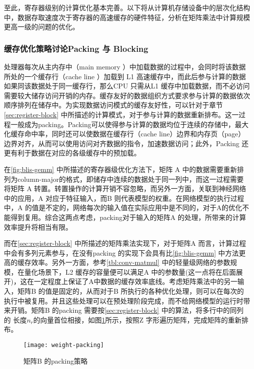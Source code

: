 至此，寄存器级别的计算优化基本完善。以下将从计算机存储设备中的层次化结构中，数据存取速度次于寄存器的高速缓存的硬件特征，分析在矩阵乘法中计算规模更高一级的问题的优化。

\subsubsection{缓存优化策略讨论Packing 与 Blocking}

处理器每次从主内存中（main memory ）中加载数据的过程中，会同时将该数据所处的一个缓存行（cache line ）加载到 L1 高速缓存中，而此后参与计算的数据如果同该数据处于同一缓存行，那么CPU 只需从L1 缓存中加载数据，而不必访问需要较大储存访问开销的内存。缓存友好的数据组织方式要求参与计算的数据依次顺序排列在储存中。为实现数据访问模式的缓存友好性，可以针对于章节\ref{sec:register-block} 中所描述的计算模式，对于参与计算的数据重新排布。这一过程一般成为packing。Packing可以使得参与计算的数据均位于连续的存储中，最大化缓存命中率，同时还可以使数据在缓存行（cache line）边界和内存页（page）边界对齐，从而可以使用访问对齐数据的指令，加速数据访问；此外，Packing 还更有利于数据在对应的各级缓存中的预加载。

在\ref{fig:blis-gemm} 中所描述的寄存器级优化方法下，矩阵 A 中的数据需要重新排列为column-major的格式，即储存中连续的数据处于同一列中，而这一过程需要将矩阵 A 转置。转置操作的计算开销不容忽略，而另外一方面，关联到神经网络中的应用，A 对应于特征输入，而B 则代表模型的权重。在网络模型的执行过程中，A 的值是不定的，网络每次的输入值在实际应用中是不同的，对于A的优化不能得到复用。综合这两点考虑，packing对于输入的矩阵A 的处理，所带来的计算效率提升将相当有限。

而在\ref{sec:register-block} 中所描述的矩阵乘法实现下，对于矩阵A 而言，计算过程中会有多列元素参与，在没有packing 的实现下会具有比\ref{fig:blis-gemm} 中方法更高的缓存效率。另外一方面，参考\ref{tbl:conv-matmul} 中的轻量级网络的参数规模，在量化场景下，L2 缓存的容量便可以满足A 中的参数量(这一点将在后面展开)，这在一定程度上保证了A中数据的缓存效率底线。考虑矩阵乘法中的另一输入，矩阵B 的值是固定的，从而对于B 所执行的各种优化处理，则可以在每次的执行中被复用。并且这些处理可以在预处理阶段完成，而不给网络模型的运行时带来开销。矩阵B 的packing 需要按\ref{sec:register-block} 中的算法，将多行中的同列的 长度$n_r$的向量首位相接，如图\ref{fig:weight-pack}所示，按照Z 字形遍历矩阵，完成矩阵的重新排布。 

\begin{figure}
  \centering
  \texttt{[image: weight-packing]}
  \caption{矩阵B 的packing策略}
  \label{fig:weight-pack}
\end{figure}

